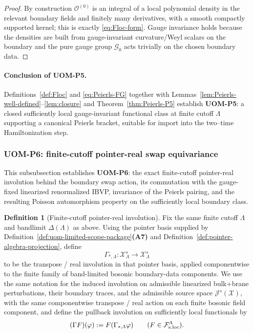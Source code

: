 \documentclass[10pt]{article}
\theoremstyle{definition}
\newtheorem{definition}{Definition}[section]
\theoremstyle{plain}
\begin{document}
\begin{proof}
By construction $\mathcal O^{(0)}$ is an integral of a local polynomial density in the relevant boundary fields and finitely many derivatives,
with a smooth compactly supported kernel; this is exactly \eqref{eq:Floc-form}.  Gauge invariance holds because the densities are built from
gauge-invariant curvature/Weyl scalars on the boundary and the pure gauge group $\mathcal G_0$ acts trivially on the chosen boundary data.
\end{proof}

\paragraph{Conclusion of UOM-P5.}
Definitions~\ref{def:Floc} and \eqref{eq:Peierls-FG} together with Lemmas~\ref{lem:Peierls-well-defined}--\ref{lem:closure} and
Theorem~\ref{thm:Peierls-P5} establish \textbf{UOM-P5}: a closed sufficiently local gauge-invariant functional class at finite cutoff $\Lambda$
supporting a canonical Peierls bracket, suitable for import into the two--time Hamiltonization step.

\subsubsection{UOM-P6: finite-cutoff pointer-real swap equivariance}
\label{subsubsec:uom-P6}

This subsubsection establishes \textbf{UOM-P6}: the exact finite-cutoff pointer-real involution behind the boundary swap action, its
commutation with the gauge-fixed linearized renormalized IBVP, invariance of the Peierls pairing, and the resulting Poisson automorphism
property on the sufficiently local boundary class.

\begin{definition}[Finite-cutoff pointer-real involution]
\label{def:uom-gamma-star}
Fix the same finite cutoff $\Lambda$ and bandlimit $\Delta(\Lambda)$ as above.  Using the pointer basis supplied by
Definition~\ref{def:uom-limited-scope-package}\textnormal{\textbf{(A7)}} and Definition~\ref{def:pointer-algebra-projection}, define
\[
\Gamma_{*,\Lambda}:\mathcal X_\Lambda^s\to\mathcal X_\Lambda^s
\]
to be the transpose / real involution in that pointer basis, applied componentwise to the finite family of band-limited bosonic
boundary-data components.  We use the same notation for the induced involution on admissible linearized bulk+brane perturbations,
their boundary traces, and the admissible source space
\(
\mathcal J^s(\mathscr X)
\),
with the same componentwise transpose / real action on each finite bosonic field component, and define the pullback involution on
sufficiently local functionals by
\[
(\Gamma F)(\varphi):=F(\Gamma_{*,\Lambda}\varphi)
\qquad
(F\in\mathcal F_{\rm s.loc}^\Lambda).
\]
\end{definition}
\end{document}
